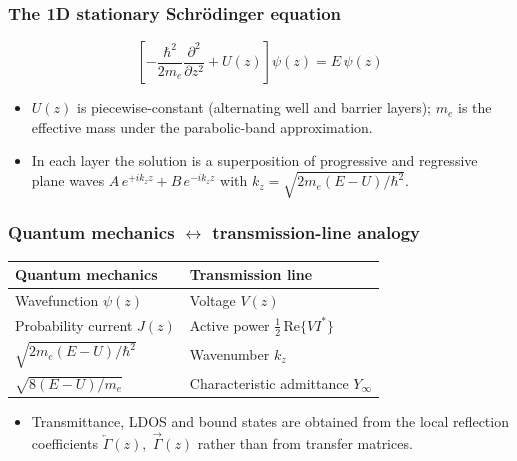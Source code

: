 \begin{frame}
    \frametitle{The 1D stationary Schr\"odinger equation}
    \begin{equation*}
        \left[-\frac{\hbar^{2}}{2m_{e}}\frac{\partial^{2}}{\partial z^{2}} + U(z)\right]\psi(z) = E\,\psi(z)
    \end{equation*}
    \begin{itemize}
        \item $U(z)$ is piecewise-constant (alternating well and barrier layers); $m_{e}$ is the effective mass under the parabolic-band approximation.
        \item In each layer the solution is a superposition of progressive and regressive plane waves $A\,e^{+ik_{z}z} + B\,e^{-ik_{z}z}$ with $k_{z} = \sqrt{2m_{e}(E-U)/\hbar^{2}}$.
    \end{itemize}
\end{frame}

\begin{frame}
    \frametitle{Quantum mechanics $\leftrightarrow$ transmission-line analogy}
    \begin{center}
        \renewcommand{\arraystretch}{1.35}
        \begin{tabular}{l|l}
            \textbf{Quantum mechanics} & \textbf{Transmission line} \\
            \hline
            Wavefunction $\psi(z)$ & Voltage $V(z)$ \\
            Probability current $J(z)$ & Active power $\tfrac{1}{2}\,\mathrm{Re}\{V I^{*}\}$ \\
            $\sqrt{2m_{e}(E-U)/\hbar^{2}}$ & Wavenumber $k_{z}$ \\
            $\sqrt{8(E-U)/m_{e}}$ & Characteristic admittance $Y_{\infty}$ \\
        \end{tabular}
    \end{center}
    \vspace{0.4em}
    \begin{itemize}
        \item Transmittance, LDOS and bound states are obtained from the local reflection coefficients $\overleftarrow{\Gamma}(z),\;\overrightarrow{\Gamma}(z)$ rather than from transfer matrices.
    \end{itemize}
\end{frame}

